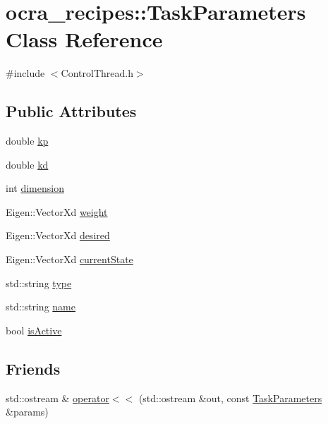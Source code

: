 \hypertarget{classocra__recipes_1_1TaskParameters}{}\section{ocra\+\_\+recipes\+:\+:Task\+Parameters Class Reference}
\label{classocra__recipes_1_1TaskParameters}


{\ttfamily \#include $<$Control\+Thread.\+h$>$}

\subsection*{Public Attributes}
\begin{DoxyCompactItemize}
\item 
double \hyperlink{classocra__recipes_1_1TaskParameters_a644ed196f6bf867e46d7faab9ac287b3}{kp}
\item 
double \hyperlink{classocra__recipes_1_1TaskParameters_a8a90d9db17c0faeb26624899264eec9e}{kd}
\item 
int \hyperlink{classocra__recipes_1_1TaskParameters_a9102d4eee6b4dedb4bfb9181d348ed9c}{dimension}
\item 
Eigen\+::\+Vector\+Xd \hyperlink{classocra__recipes_1_1TaskParameters_aa960ee789e002d17f148a67cb8b35251}{weight}
\item 
Eigen\+::\+Vector\+Xd \hyperlink{classocra__recipes_1_1TaskParameters_a1dbe7dbb189079f4c8b7cd8f60a3b33e}{desired}
\item 
Eigen\+::\+Vector\+Xd \hyperlink{classocra__recipes_1_1TaskParameters_a323bf15f03055fcbf07f865ba9074381}{current\+State}
\item 
std\+::string \hyperlink{classocra__recipes_1_1TaskParameters_a8c62a820309b362ba4ce8c515a66aff4}{type}
\item 
std\+::string \hyperlink{classocra__recipes_1_1TaskParameters_a8d9b23fed4d4207bed2b48625acb8910}{name}
\item 
bool \hyperlink{classocra__recipes_1_1TaskParameters_a1e4df01753f82bc359f9632817e61e2b}{is\+Active}
\end{DoxyCompactItemize}
\subsection*{Friends}
\begin{DoxyCompactItemize}
\item 
std\+::ostream \& \hyperlink{classocra__recipes_1_1TaskParameters_a8efa666207faa3291d83472bfee94a08}{operator$<$$<$} (std\+::ostream \&out, const \hyperlink{classocra__recipes_1_1TaskParameters}{Task\+Parameters} \&params)
\end{DoxyCompactItemize}


